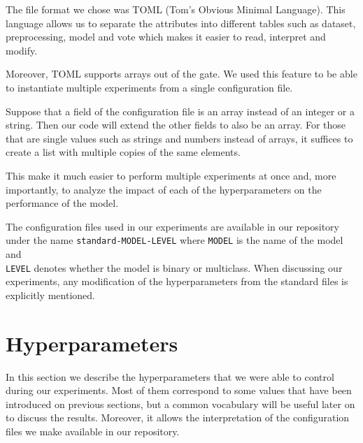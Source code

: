 The file format we chose was TOML (Tom's Obvious Minimal Language).
This language allows us to separate the attributes into different tables such as dataset, preprocessing, model and vote which makes it easier to read, interpret and modify.

Moreover, TOML supports arrays out of the gate.
We used this feature to be able to instantiate multiple experiments from a single configuration file.

Suppose that a field of the configuration file is an array instead of an integer or a string.
Then our code will extend the other fields to also be an array.
For those that are single values such as strings and numbers instead of arrays, it suffices to create a list with multiple copies of the same elements.

This make it much easier to perform multiple experiments at once and, more importantly, to analyze the impact of each of the hyperparameters on the performance of the model.

The configuration files used in our experiments are available in our repository under the name \verb|standard-MODEL-LEVEL| where \verb|MODEL| is the name of the model and \\ \verb|LEVEL| denotes whether the model is binary or multiclass.
When discussing our experiments, any modification of the hyperparameters from the standard files is explicitly mentioned.

\section{Hyperparameters}

In this section we describe the hyperparameters that we were able to control during our experiments.
Most of them correspond to some values that have been introduced on previous sections, but a common vocabulary will be useful later on to discuss the results.
Moreover, it allows the interpretation of the configuration files we make available in our repository.


